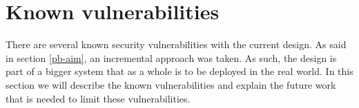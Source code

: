 \chapter{Known vulnerabilities}
\label{problems}
There are several known security vulnerabilities with the current design.
As said in section \ref{pb-aim}, an incremental approach was taken.
As such, the design is part of a bigger system that as a whole is to be deployed in the real world.
In this section we will describe the known vulnerabilities
and explain the future work that is needed to limit these vulnerabilities.









